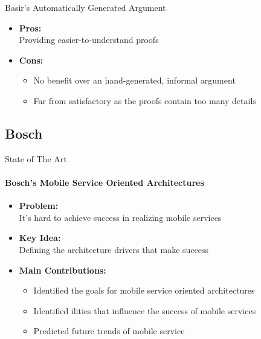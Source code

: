 \documentclass[xcolor=x11names,compress]{beamer}
\renewcommand{\(}{\begin{columns}}
\renewcommand{\)}{\end{columns}}
\newcommand{\<}[1]{\begin{column}{#1}}
\renewcommand{\>}{\end{column}}
\begin{document}
\begin{frame}{Basir's Automatically Generated Argument}
\begin{itemize}
\item \textbf{Pros:} \\
	Providing easier-to-understand proofs
\item \textbf{Cons:} \\
    \begin{itemize}
	\item No benefit over an hand-generated, informal argument
    \item Far from satisfactory as the proofs contain too many details
    \end{itemize}
\end{itemize}
\end{frame}


\subsection{Bosch}
\begin{frame}{State of The Art}
\framesubtitle{Bosch's Mobile Service Oriented Architectures \cite{vanGurp:MOSOA}}
\begin{itemize}
\item \textbf{Problem:}\\It's hard to achieve success in realizing mobile services
\item \textbf{Key Idea:} \\Defining the architecture drivers that make success
\item \textbf{Main Contributions:}
\begin{itemize}
	\item Identified the goals for mobile service oriented architectures
	\item Identified ilities that influence the success of mobile services
	\item Predicted future trends of mobile service
\end{itemize}
\end{itemize}

\end{frame}


\end{document}
